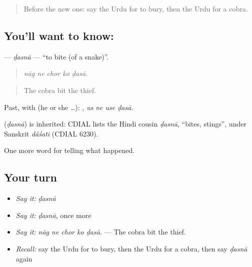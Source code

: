 \label{lesson:UR-C327-dasna}



\begin{quote}
Before the new one: say the Urdu for to bury, then the Urdu for a cobra.
\end{quote}

\subsection*{You'll want to know: }
\textbf{} — \emph{ḍasnā} — \textquotedblleft{}to bite (of a snake)\textquotedblright{}.

\begin{quote}
    
\end{quote}

\begin{quote}
\emph{nāg ne chor ko ḍasā.}
\end{quote}

\begin{quote}
The cobra bit the thief.
\end{quote}

Past, with  (he or she …):    , \emph{us ne use ḍasā}.

\begin{cousinweb}
\textbf{} (\emph{ḍasnā}) is inherited: CDIAL lists the Hindi cousin \emph{ḍasnā}, \textquotedblleft{}bites, stings\textquotedblright{}, under Sanskrit \emph{dáśati} (CDIAL 6230).
\end{cousinweb}

\begin{grammarlens}[title={What you've built}]
One more word for telling what happened.
\end{grammarlens}

\subsection*{Your turn}
\begin{itemize}
\raggedright
  \item \emph{Say it:} \emph{ḍasnā}
  \item \emph{Say it:} \emph{ḍasnā}, once more
  \item \emph{Say it:} \emph{nāg ne chor ko ḍasā.} — The cobra bit the thief.
  \item \emph{Recall:} say the Urdu for to bury, then the Urdu for a cobra, then say \emph{ḍasnā} again
\end{itemize}

